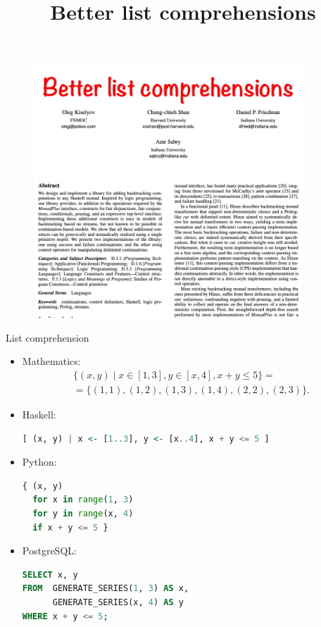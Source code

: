 \documentclass[handout]{beamer}
\begin{document}
\title{Better list comprehensions}

\begin{frame}
\begin{figure}[H]
\centering
\includegraphics[width=0.9\textwidth]{better-list-comprehensions.png}
\end{figure}
\end{frame}


\begin{frame}[fragile]{List comprehension}

\vspace{-1.4ex}

\begin{itemize}[<+->]

\item Mathematics:
\begin{multline*}
\{ (x, y) \mid x \in [1,3], y \in [x,4], x + y \le 5 \}
= \\ =
\{ (1, 1), (1, 2), (1, 3), (1, 4), (2, 2), (2, 3) \}.
\end{multline*}

\item Haskell:
\begin{lstlisting}[language=Haskell]
[ (x, y) | x <- [1..3], y <- [x..4], x + y <= 5 ]
\end{lstlisting}

\item Python:
\begin{lstlisting}[language=Python]
{ (x, y)
  for x in range(1, 3)
  for y in range(x, 4)
  if x + y <= 5 }
\end{lstlisting}

\item PostgreSQL:
\begin{lstlisting}[language=SQL]
SELECT x, y
FROM  GENERATE_SERIES(1, 3) AS x,
      GENERATE_SERIES(x, 4) AS y
WHERE x + y <= 5;
\end{lstlisting}

\end{itemize}

\end{frame}
\end{document}
